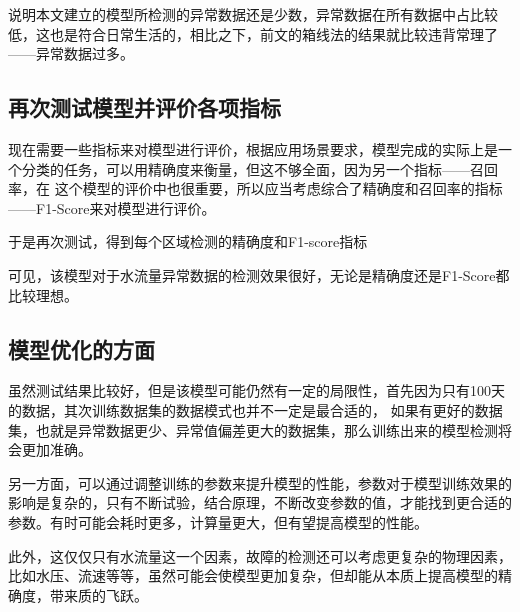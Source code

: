 \documentclass[UTF8]{article}
\begin{document}
			说明本文建立的模型所检测的异常数据还是少数，异常数据在所有数据中占比较低，这也是符合日常生活的，相比之下，前文的箱线法的结果就比较违背常理了——异常数据过多。
			\subsection{再次测试模型并评价各项指标}
				\par 现在需要一些指标来对模型进行评价，根据应用场景要求，模型完成的实际上是一个分类的任务，可以用精确度来衡量，但这不够全面，因为另一个指标——召回率，在
				这个模型的评价中也很重要，所以应当考虑综合了精确度和召回率的指标——F1-Score来对模型进行评价。
				\par 于是再次测试，得到每个区域检测的精确度和F1-score指标
				\begin{table}[!ht]
					\centering
				\end{table}
			可见，该模型对于水流量异常数据的检测效果很好，无论是精确度还是F1-Score都比较理想。
				\subsection{模型优化的方面}
				\par 虽然测试结果比较好，但是该模型可能仍然有一定的局限性，首先因为只有100天的数据，其次训练数据集的数据模式也并不一定是最合适的，
				如果有更好的数据集，也就是异常数据更少、异常值偏差更大的数据集，那么训练出来的模型检测将会更加准确。
				\par 另一方面，可以通过调整训练的参数来提升模型的性能，参数对于模型训练效果的影响是复杂的，只有不断试验，结合原理，不断改变参数的值，才能找到更合适的参数。有时可能会耗时更多，计算量更大，但有望提高模型的性能。
				\par 此外，这仅仅只有水流量这一个因素，故障的检测还可以考虑更复杂的物理因素，比如水压、流速等等，虽然可能会使模型更加复杂，但却能从本质上提高模型的精确度，带来质的飞跃。
	\newpage
	
	
	\newpage
\end{document}
